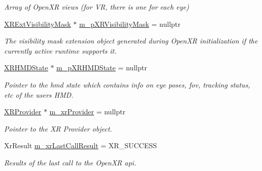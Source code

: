 \begin{DoxyCompactItemize}
\begin{DoxyCompactList}\small\item\em Array of Open\+XR views (for VR, there is one for each eye) \end{DoxyCompactList}\item 
\mbox{\hyperlink{class_open_x_r_provider_1_1_x_r_ext_visibility_mask}{X\+R\+Ext\+Visibility\+Mask}} $\ast$ \mbox{\hyperlink{class_open_x_r_provider_1_1_x_r_render_manager_af5bf048e754360884f06006598d5682d}{m\+\_\+p\+X\+R\+Visibility\+Mask}} = nullptr
\begin{DoxyCompactList}\small\item\em The visibility mask extension object generated during Open\+XR initialization if the currently active runtime supports it. \end{DoxyCompactList}\item 
\mbox{\hyperlink{struct_open_x_r_provider_1_1_x_r_h_m_d_state}{X\+R\+H\+M\+D\+State}} $\ast$ \mbox{\hyperlink{class_open_x_r_provider_1_1_x_r_render_manager_a20ef86e4265f435a761a010700d0e715}{m\+\_\+p\+X\+R\+H\+M\+D\+State}} = nullptr
\begin{DoxyCompactList}\small\item\em Pointer to the hmd state which contains info on eye poses, fov, tracking status, etc of the user\textquotesingle{}s H\+MD. \end{DoxyCompactList}\item 
\mbox{\hyperlink{class_open_x_r_provider_1_1_x_r_provider}{X\+R\+Provider}} $\ast$ \mbox{\hyperlink{class_open_x_r_provider_1_1_x_r_render_manager_a93496eb096c4b871d404db68d01787a8}{m\+\_\+xr\+Provider}} = nullptr
\begin{DoxyCompactList}\small\item\em Pointer to the XR Provider object. \end{DoxyCompactList}\item 
Xr\+Result \mbox{\hyperlink{class_open_x_r_provider_1_1_x_r_render_manager_a85321909f010e4314693433c83c14b2d}{m\+\_\+xr\+Last\+Call\+Result}} = X\+R\+\_\+\+S\+U\+C\+C\+E\+SS
\begin{DoxyCompactList}\small\item\em Results of the last call to the Open\+XR api. \end{DoxyCompactList}\end{DoxyCompactItemize}
